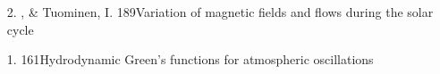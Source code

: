 \begin{itemize}
\item[2.]
\Brandenburg, \& Tuominen, I.
{189}{Variation of magnetic fields and flows during the solar cycle}
 
\item[1.]
\Brandenburg{}
{161}{Hydrodynamic Green's functions for atmospheric oscillations}




\end{itemize}

